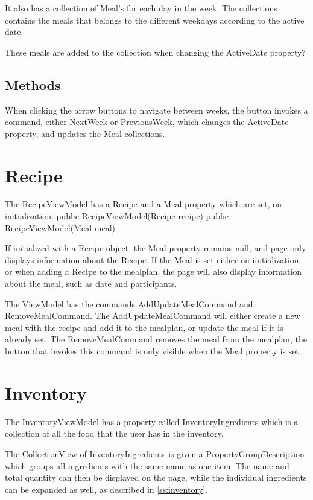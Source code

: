 It also has a collection of Meal's for each day in the week. The collections contains the meals that belongs to the different weekdays according to the active date.

These meals are added to the collection when changing the ActiveDate property?

\subsection{Methods}
When clicking the arrow buttons to navigate between weeks, the button invokes a command, either NextWeek or PreviousWeek, which changes the ActiveDate property, and updates the Meal collections.


\section{Recipe}

The RecipeViewModel has a Recipe and a Meal property which are set, on initialization. 
        public RecipeViewModel(Recipe recipe)
        public RecipeViewModel(Meal meal)

If initialized with a Recipe object, the Meal property remains null, and page only displays information about the Recipe. If the Meal is set either on initialization or when adding a Recipe to the mealplan, the page will also display information about the meal, such as date and participants.

The ViewModel has the commands AddUpdateMealCommand and RemoveMealCommand. The AddUpdateMealCommand will either create a new meal with the recipe and add it to the mealplan, or update the meal if it is already set.
The RemoveMealCommand removes the meal from the mealplan, the button that invokes this command is only visible when the Meal property is set.


\section{Inventory}
The InventoryViewModel has a property called InventoryIngredients which is a collection of all the food that the user has in the inventory.

The CollectionView of InventoryIngredients is given a PropertyGroupDescription which groups all ingredients with the same name as one item. The name and total quantity can then be displayed on the page, while the individual ingredients can be expanded as well, as described in \cref{ss:inventory}.

